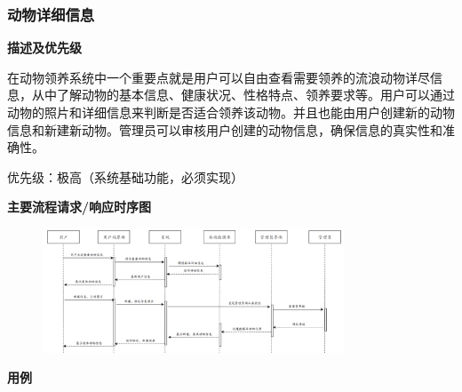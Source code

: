 \documentclass[12pt,a4paper,UTF8]{article}
\begin{document}
\subsubsection{动物详细信息}

\noindent\textbf{描述及优先级}

在动物领养系统中一个重要点就是用户可以自由查看需要领养的流浪动物详尽信息，从中了解动物的基本信息、健康状况、性格特点、领养要求等。用户可以通过动物的照片和详细信息来判断是否适合领养该动物。并且也能由用户创建新的动物信息和新建新动物。管理员可以审核用户创建的动物信息，确保信息的真实性和准确性。

优先级：极高（系统基础功能，必须实现）

\noindent\textbf{主要流程请求/响应时序图}

\begin{figure}[H]
  \centering
  \includegraphics[width=0.8\textwidth]{figures/use324.png}
\end{figure}

\noindent\textbf{用例}
\end{document}
